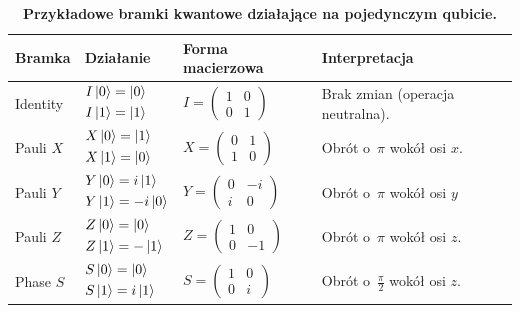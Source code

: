 \begin{table}[H]
\caption{\textbf{Przykładowe bramki kwantowe działające na pojedynczym qubicie.}}
\label{tab:bramki_kwantowe}
\resizebox{\textwidth}{!}
{
    \centering
    \begin{tabular}{l l l l}
        \hline
        \textbf{Bramka} & \textbf{Działanie} & \textbf{Forma macierzowa} & \textbf{Interpretacja} \\
        \hline
        Identity & $\begin{aligned} I\ket{0} &= \ket{0} \\ I\ket{1} &= \ket{1} \end{aligned}$ & $I = \begin{pmatrix} 1 & 0 \\ 0 & 1 \end{pmatrix}$ & Brak zmian (operacja neutralna). \\
        \hline
        Pauli $X$ & $\begin{aligned} X\ket{0} &= \ket{1} \\ X\ket{1} &= \ket{0} \end{aligned}$ & $X = \begin{pmatrix} 0 & 1 \\ 1 & 0 \end{pmatrix}$ & Obrót o~$\pi$ wokół osi $x$. \\
        \hline
        Pauli $Y$ & $\begin{aligned} Y\ket{0} &= i\ket{1} \\ Y\ket{1} &= -i\ket{0} \end{aligned}$ & $Y = \begin{pmatrix} 0 & -i \\ i~& 0 \end{pmatrix}$ & Obrót o~$\pi$ wokół osi $y$ \\
        \hline
        Pauli $Z$ & $\begin{aligned} Z\ket{0} &= \ket{0} \\ Z\ket{1} &= -\ket{1} \end{aligned}$ & $Z = \begin{pmatrix} 1 & 0 \\ 0 & -1 \end{pmatrix}$ & Obrót o~$\pi$ wokół osi $z$. \\
        \hline
        Phase $S$ & $\begin{aligned} S\ket{0} &= \ket{0} \\ S\ket{1} &= i\ket{1} \end{aligned}$ & $S = \begin{pmatrix} 1 & 0 \\ 0 & i~\end{pmatrix}$ & Obrót o~$\frac{\pi}{2}$ wokół osi $z$. \\

\end{tabular}}
\end{table}
